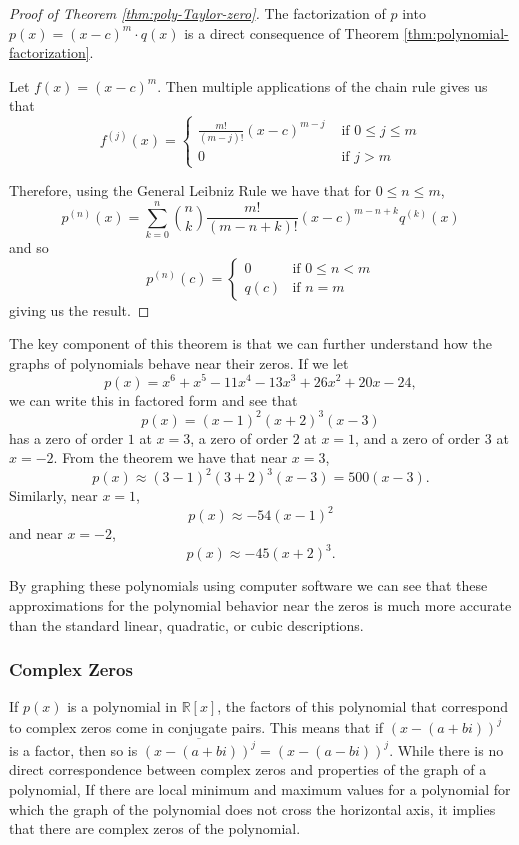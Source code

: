 \documentclass[
]{book}
\theoremstyle{definition}
\theoremstyle{definition}
\theoremstyle{definition}
\theoremstyle{definition}
\theoremstyle{remark}
\begin{document}
\begin{proof}[Proof of Theorem \ref{thm:poly-Taylor-zero}]

The factorization of \(p\) into \(p(x)=(x-c)^m \cdot q(x)\) is a direct consequence of Theorem \ref{thm:polynomial-factorization}.

Let \(f(x)=(x-c)^m\). Then multiple applications of the chain rule gives us that
\[f^{(j)}(x) = \begin{cases}
 \frac{m!}{(m-j)!} (x-c)^{m-j} & \mbox{ if } 0 \leq j \leq m \\
0 & \mbox{ if } j>m 
\end{cases}\]

Therefore, using the General Leibniz Rule we have that for \(0\leq n \leq m\),
\[p^{(n)}(x) = \sum_{k=0}^n \binom{n}{k} \frac{m!}{(m-n+k)!} (x-c)^{m-n+k} q^{(k)}(x)\] and so
\[p^{(n)}(c) = 
\begin{cases}
0 & \mbox{if } 0 \leq n < m\\
q(c) & \mbox{if } n=m   
\end{cases}\]
giving us the result.

\end{proof}

The key component of this theorem is that we can further understand how the graphs of polynomials behave near their zeros. If we let \[p(x)=x^6+x^5-11x^4-13x^3+26x^2+20x-24,\] we can write this in factored form and see that \[p(x)=(x-1)^2(x+2)^3(x-3)\] has a zero of order \(1\) at \(x=3\), a zero of order \(2\) at \(x=1\), and a zero of order \(3\) at \(x=-2\). From the theorem we have that near \(x=3\), \[p(x) \approx (3-1)^2(3+2)^3(x-3) = 500 (x-3).\] Similarly, near \(x=1\), \[p(x) \approx -54 (x-1)^2\] and near \(x=-2\), \[p(x)\approx -45 (x+2)^3.\]

By graphing these polynomials using computer software we can see that these approximations for the polynomial behavior near the zeros is much more accurate than the standard linear, quadratic, or cubic descriptions.

\hypertarget{complex-zeros}{%
\subsubsection{Complex Zeros}\label{complex-zeros}}

If \(p(x)\) is a polynomial in \(\mathbb{R}[x]\), the factors of this polynomial that correspond to complex zeros come in conjugate pairs. This means that if \((x-(a+bi))^j\) is a factor, then so is \(\overline{(x-(a+bi))^j}= (x-(a-bi))^j\). While there is no direct correspondence between complex zeros and properties of the graph of a polynomial, If there are local minimum and maximum values for a polynomial for which the graph of the polynomial does not cross the horizontal axis, it implies that there are complex zeros of the polynomial.
\end{document}
